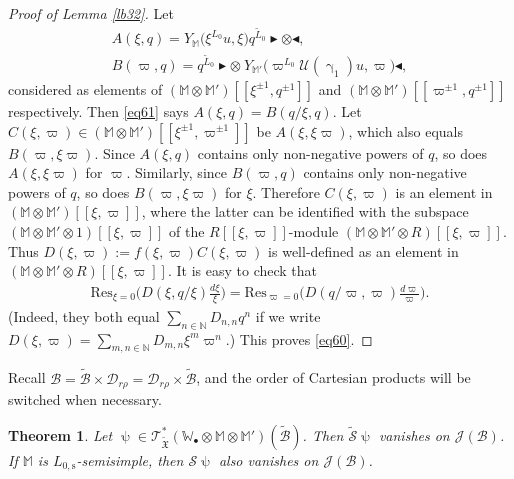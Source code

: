 \documentclass[12pt,a4paper,notitlepage]{article}
\theoremstyle{definition}
\theoremstyle{plain}
\newtheorem{thm}[df]{Theorem}
\newcommand{\fk}{\mathfrak}
\newcommand{\mc}{\mathcal}
\newcommand{\wtd}{\widetilde}
\newcommand{\Res}{\mathrm{Res}}
\newcommand{\scr}{\mathscr}
\newcommand{\blt}{\bullet}
\newcommand{\Wbb}{\mathbb W}
\newcommand{\Mbb}{\mathbb M}
\newcommand{\Nbb}{\mathbb N}
\newcommand{\btl}{\blacktriangleleft}
\newcommand{\btr}{\blacktriangleright}
\newcommand{\Lss}{{L_{0,\mathrm{s}}}}
\numberwithin{equation}{section}
\begin{document}
\begin{proof}[Proof of Lemma \ref{lb32}]
	Let 
	\begin{gather*}
	A(\xi,q)=Y_{\Mbb}\big(\xi^{L_0}u,\xi\big)q^{\wtd L_0}\btr\otimes\btl,\\
	B(\varpi,q)=q^{\wtd L_0}\btr\otimes~Y_{\Mbb'}\big(\varpi^{L_0}\mc U(\upgamma_1)u,\varpi\big)\btl,
	\end{gather*}
	considered as elements of $(\Mbb\otimes\Mbb')[[\xi^{\pm1},q^{\pm 1}]]$ and $(\Mbb\otimes\Mbb')[[\varpi^{\pm1},q^{\pm 1}]]$ respectively. Then \eqref{eq61} says $A(\xi,q)=B(q/\xi,q)$. Let $C(\xi,\varpi)\in(\Mbb\otimes\Mbb')[[\xi^{\pm 1},\varpi^{\pm1}]]$  be $A(\xi,\xi\varpi)$, which also equals $B(\varpi,\xi\varpi)$. Since $A(\xi,q)$ contains only non-negative  powers of $q$, so does $A(\xi,\xi\varpi)$ for $\varpi$.   Similarly, since $B(\varpi,q)$ contains only non-negative powers of $q$, so does $B(\varpi,\xi\varpi)$ for $\xi$. Therefore $C(\xi,\varpi)$ is an element in  $(\Mbb\otimes\Mbb')[[\xi,\varpi]]$, where the latter  can be identified with the subspace $(\Mbb\otimes\Mbb'\otimes 1)[[\xi,\varpi]]$ of the $R[[\xi,\varpi]]$-module $(\Mbb\otimes\Mbb'\otimes R)[[\xi,\varpi]]$. Thus $D(\xi,\varpi):=f(\xi,\varpi)C(\xi,\varpi)$ is well-defined as an element in $(\Mbb\otimes\Mbb'\otimes R)[[\xi,\varpi]]$. It is easy to check that
	\begin{align*}
	\Res_{\xi=0}\bigg(D(\xi,q/\xi)\frac{d\xi}{\xi}\bigg)=\Res_{\varpi=0}\bigg(D(q/\varpi,\varpi)\frac{d\varpi}{\varpi}\bigg).
	\end{align*}
	(Indeed, they both equal $\sum_{n\in\Nbb}D_{n,n}q^n$ if we write $D(\xi,\varpi)=\sum_{m,n\in\Nbb}D_{m,n}\xi^m\varpi^n$.) This proves \eqref{eq60}.
\end{proof}




Recall $\mc B=\wtd{\mc B}\times\mc D_{r\rho}=\mc D_{r\rho}\times\wtd{\mc B}$, and the order of Cartesian products will be switched when necessary.

\begin{thm}\label{lb34}
	Let $\uppsi\in\scr T_{\wtd{\fk X}}^*(\Wbb_\blt\otimes\Mbb\otimes\Mbb')(\wtd{\mc B})$. Then $\wtd{\mc S}\uppsi$ vanishes on $\scr J(\mc B)$. If $\Mbb$ is  $\Lss$-semisimple, then  $\mc S\uppsi$ also vanishes on $\scr J(\mc B)$.
\end{thm}
\end{document}

